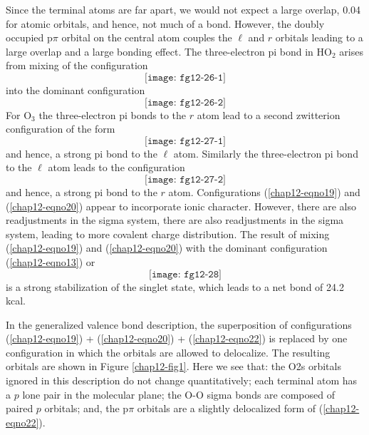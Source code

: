 Since the terminal atoms are far apart, we would not expect a large 
overlap, 0.04 for atomic
orbitals, and hence, not much of a bond. However, the doubly occupied 
p$\pi$ orbital on the central atom
couples the $\ell$ and $r$ orbitals leading to a large overlap and a large bonding 
effect. The three-electron pi
bond in HO$_2$ arises from mixing of the configuration
\begin{equation}
\texttt{[image: fg12-26-1]}
\label{chap12-eqno17}
\end{equation}
into the dominant configuration
\begin{equation}
\texttt{[image: fg12-26-2]}
\label{chap12-eqno18}
\end{equation}
For O$_3$ the three-electron pi bonds to the $r$ atom lead to a second 
zwitterion configuration of the form
\begin{equation}
\texttt{[image: fg12-27-1]}
\label{chap12-eqno19}
\end{equation}
and hence, a strong pi bond to the $\ell$ atom.  Similarly the three-electron 
pi bond to the $\ell$ atom leads to the configuration
\begin{equation}
\texttt{[image: fg12-27-2]}
\label{chap12-eqno20}
\end{equation}
and hence, a strong pi bond to the $r$ atom.  Configurations
(\ref{chap12-eqno19}) and (\ref{chap12-eqno20}) appear to incorporate
ionic character.  However, there are also readjustments in the sigma
system, there are also readjustments in the sigma system, leading to
more covalent charge distribution.  The result of mixing
(\ref{chap12-eqno19}) and (\ref{chap12-eqno20}) with the dominant
configuration (\ref{chap12-eqno13}) or
\begin{equation}
\texttt{[image: fg12-28]}
\label{chap12-eqno22}
\end{equation}
is a strong stabilization of the singlet state, which leads to a net bond of 
24.2 kcal.

In the generalized valence bond description, the superposition of
configurations (\ref{chap12-eqno19}) + (\ref{chap12-eqno20}) +
(\ref{chap12-eqno22}) is replaced by one configuration in which the
orbitals are allowed to delocalize.  The resulting orbitals are shown
in Figure \ref{chap12-fig1}.  Here we see that: the O2s orbitals
ignored in this description do not change quantitatively; each
terminal atom has a $p$ lone pair in the molecular plane; the O-O
sigma bonds are composed of paired $p$ orbitals; and, the p$\pi$
orbitals are a slightly delocalized form of (\ref{chap12-eqno22}).

